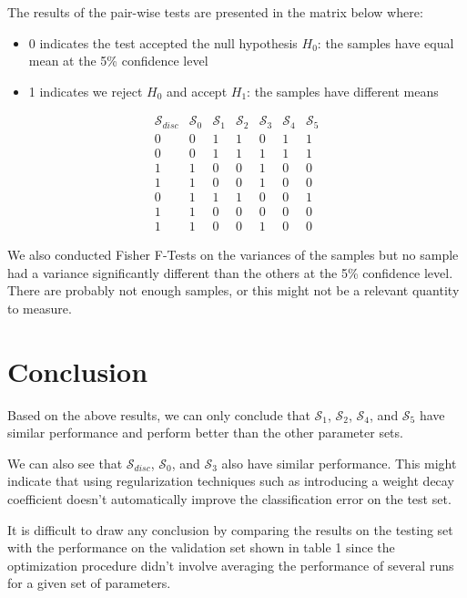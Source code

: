 \documentclass[10pt,a4paper, twocolumn]{article}
\theoremstyle{definition}
\begin{document}
The results of the pair-wise tests are presented in the matrix below where:
\begin{itemize}
\item 0 indicates the test accepted the null hypothesis $H_0$: the samples have equal mean at the 5\% confidence level
\item 1 indicates we reject $H_0$ and accept $H_1$: the samples have different means
\end{itemize}
\[
\begin{matrix}
\mathcal{S}_{disc} & \mathcal{S}_0 & \mathcal{S}_1 & \mathcal{S}_2 & \mathcal{S}_3 & \mathcal{S}_4 & \mathcal{S}_5\\
0  &   0  &   1 &    1  &   0  &   1  &   1\\
0  &   0  &   1 &    1  &   1  &   1  &   1\\
1  &   1  &   0 &    0  &   1  &   0  &   0\\
1  &   1  &   0 &    0  &   1  &   0  &   0\\
0  &   1  &   1 &    1  &   0  &   0  &   1\\
1  &   1  &   0 &    0  &   0  &   0  &   0\\
1  &   1  &   0 &    0  &   1  &   0  &   0
\end{matrix}
\]

We also conducted Fisher F-Tests on the variances of the samples but no sample had a variance significantly different than the others at the 5\% confidence level. There are probably not enough samples, or this might not be a relevant quantity to measure.

\section{Conclusion}

Based on the above results, we can only conclude that $\mathcal{S}_1$, $\mathcal{S}_2$, $\mathcal{S}_4$, and $\mathcal{S}_5$ have similar performance and perform better than the other parameter sets.

We can also see that $\mathcal{S}_{disc}$, $\mathcal{S}_0$, and $\mathcal{S}_3$ also have similar performance. This might indicate that using regularization techniques such as introducing a weight decay coefficient doesn't automatically improve the classification error on the test set.

\vspace{1em}

It is difficult to draw any conclusion by comparing the results on the testing set with the performance on the validation set shown in table 1 since the optimization procedure didn't involve averaging the performance of several runs for a given set of parameters.
\end{document}
